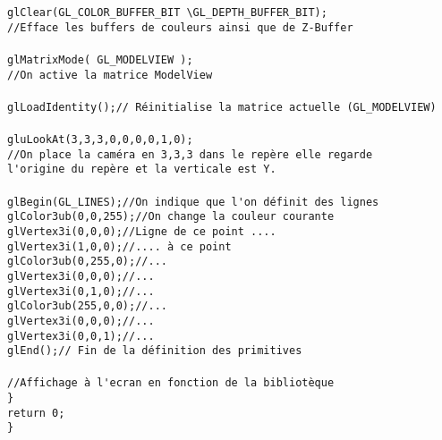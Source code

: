 \begin{tabbing}
\>\> \verb|glClear(GL_COLOR_BUFFER_BIT \GL_DEPTH_BUFFER_BIT);|\\
\>\> \verb|//Efface les buffers de couleurs ainsi que de Z-Buffer|\\
\\
\>\> \verb|glMatrixMode( GL_MODELVIEW );|\\
\>\> \verb|//On active la matrice ModelView|\\
\\
\>\> \verb|glLoadIdentity();// Réinitialise la matrice actuelle (GL_MODELVIEW)|\\
\\
\>\> \verb|gluLookAt(3,3,3,0,0,0,0,1,0);|\\
\>\> \verb|//On place la caméra en 3,3,3 dans le repère elle regarde|\\
\>\> \verb|l'origine du repère et la verticale est Y.|\\
\\
\>\> \verb|glBegin(GL_LINES);//On indique que l'on définit des lignes|\\
\>\>\> \verb|glColor3ub(0,0,255);//On change la couleur courante|\\
\>\>\> \verb|glVertex3i(0,0,0);//Ligne de ce point ....|\\
\>\>\> \verb|glVertex3i(1,0,0);//.... à ce point|\\
\>\>\> \verb|glColor3ub(0,255,0);//...|\\
\>\>\> \verb|glVertex3i(0,0,0);//...|\\
\>\>\> \verb|glVertex3i(0,1,0);//...|\\
\>\>\> \verb|glColor3ub(255,0,0);//...|\\
\>\>\> \verb|glVertex3i(0,0,0);//...|\\
\>\>\> \verb|glVertex3i(0,0,1);//...|\\
\>\> \verb|glEnd();// Fin de la définition des primitives|\\
\\
\>\> \verb|//Affichage à l'ecran en fonction de la bibliotèque|\\

\> \verb|}|\\
\> \verb|return 0;|\\
\verb|}|
\end{tabbing}
